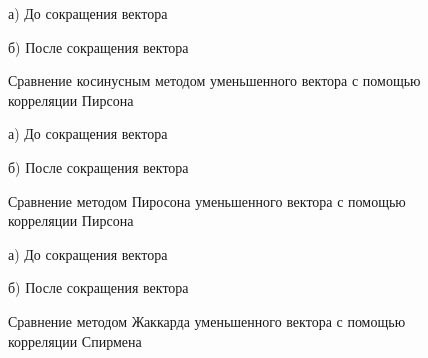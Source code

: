 \begin{figure}[H]
    \begin{minipage}[H]{0.5\linewidth}
        а) До сокращения вектора 
    \end{minipage}
    \begin{minipage}[H]{0.5\linewidth}
        б) После сокращения вектора 
    \end{minipage}
    \caption{Сравнение косинусным методом уменьшенного вектора с помощью корреляции Пирсона}
    \label{fig:heatmapPearCos}
\end{figure}

\begin{figure}[H]
    \begin{minipage}[H]{0.5\linewidth}
        а) До сокращения вектора 
    \end{minipage}
    \begin{minipage}[H]{0.5\linewidth}
        б) После сокращения вектора 
    \end{minipage}
    \caption{Сравнение методом Пиросона уменьшенного вектора с помощью корреляции Пирсона}
    \label{fig:heatmapPearPear}
\end{figure}

\begin{figure}[H]
    \begin{minipage}[H]{0.5\linewidth}
        а) До сокращения вектора 
    \end{minipage}
    \begin{minipage}[H]{0.5\linewidth}
        б) После сокращения вектора 
    \end{minipage}
    \caption{Сравнение методом Жаккарда уменьшенного вектора с помощью корреляции Спирмена}
    \label{fig:heatmapSpearJac}
\end{figure}

